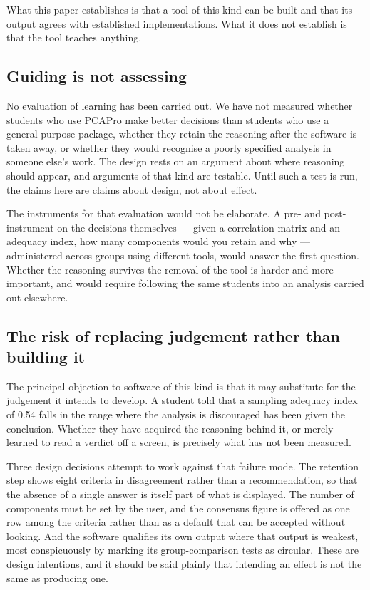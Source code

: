 \documentclass[12pt]{article}
\begin{document}
What this paper establishes is that a tool of this kind can be built and that
its output agrees with established implementations. What it does not establish
is that the tool teaches anything.

\subsection{Guiding is not assessing}

No evaluation of learning has been carried out. We have not measured whether
students who use PCAPro make better decisions than students who use a
general-purpose package, whether they retain the reasoning after the software is
taken away, or whether they would recognise a poorly specified analysis in
someone else's work. The design rests on an argument about where reasoning
should appear, and arguments of that kind are testable. Until such a test is
run, the claims here are claims about design, not about effect.

The instruments for that evaluation would not be elaborate. A pre- and
post-instrument on the decisions themselves --- given a correlation matrix and
an adequacy index, how many components would you retain and why --- administered
across groups using different tools, would answer the first question. Whether
the reasoning survives the removal of the tool is harder and more important, and
would require following the same students into an analysis carried out
elsewhere.

\subsection{The risk of replacing judgement rather than building it}

The principal objection to software of this kind is that it may substitute for
the judgement it intends to develop. A student told that a sampling adequacy
index of 0.54 falls in the range where the analysis is discouraged has been
given the conclusion. Whether they have acquired the reasoning behind it, or
merely learned to read a verdict off a screen, is precisely what has not been
measured.

Three design decisions attempt to work against that failure mode. The retention
step shows eight criteria in disagreement rather than a recommendation, so that
the absence of a single answer is itself part of what is displayed. The number
of components must be set by the user, and the consensus figure is offered as
one row among the criteria rather than as a default that can be accepted without
looking. And the software qualifies its own output where that output is weakest,
most conspicuously by marking its group-comparison tests as circular. These are
design intentions, and it should be said plainly that intending an effect is not
the same as producing one.
\end{document}
